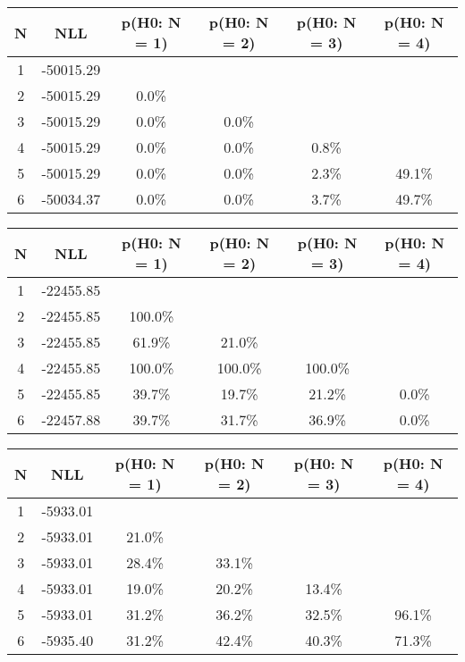 \begin{table}[h!]
	\centering
	\begin{tabular}{cc||cccc}
		N & NLL & p(H0: N = 1) & p(H0: N = 2) & p(H0: N = 3) & p(H0: N = 4)\\ 
		\hline
1 & -50015.29 & & & & \\
2 & -50015.29 & 0.0\% & & & \\
3 & -50015.29 & 0.0\% & 0.0\% & & \\
4 & -50015.29 & 0.0\% & 0.0\% & 0.8\% & \\
5 & -50015.29 & 0.0\% & 0.0\% & 2.3\% & 49.1\% \\
6 & -50034.37 & 0.0\% & 0.0\% & 3.7\% & 49.7\% \\
	\end{tabular}
	\label{tab:lab}
\end{table}

\begin{table}[h!]
	\centering
	\begin{tabular}{cc||cccc}
		N & NLL & p(H0: N = 1) & p(H0: N = 2) & p(H0: N = 3) & p(H0: N = 4)\\ 
		\hline
1 & -22455.85 & & & & \\
2 & -22455.85 & 100.0\% & & & \\
3 & -22455.85 & 61.9\% & 21.0\% & & \\
4 & -22455.85 & 100.0\% & 100.0\% & 100.0\% & \\
5 & -22455.85 & 39.7\% & 19.7\% & 21.2\% & 0.0\% \\
6 & -22457.88 & 39.7\% & 31.7\% & 36.9\% & 0.0\% \\
	\end{tabular}
	\label{tab:lab}
\end{table}

\begin{table}[h!]
	\centering
	\begin{tabular}{cc||cccc}
		N & NLL & p(H0: N = 1) & p(H0: N = 2) & p(H0: N = 3) & p(H0: N = 4)\\ 
		\hline
1 & -5933.01 & & & & \\
2 & -5933.01 & 21.0\% & & & \\
3 & -5933.01 & 28.4\% & 33.1\% & & \\
4 & -5933.01 & 19.0\% & 20.2\% & 13.4\% & \\
5 & -5933.01 & 31.2\% & 36.2\% & 32.5\% & 96.1\% \\
6 & -5935.40 & 31.2\% & 42.4\% & 40.3\% & 71.3\% \\
	\end{tabular}
	\label{tab:lab}
\end{table}

